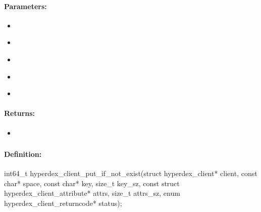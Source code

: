 \paragraph{Parameters:}
\begin{itemize}[noitemsep]
\item {}\\

\item {}\\

\item {}\\

\item {}\\

\item {}\\

\end{itemize}

\paragraph{Returns:}
\begin{itemize}[noitemsep]
\item {}\\

\end{itemize}

\pagebreak
\subsubsection{}
\label{api:c:put_if_not_exist}


\paragraph{Definition:}
\begin{ccode}
int64_t hyperdex_client_put_if_not_exist(struct hyperdex_client* client,
        const char* space,
        const char* key, size_t key_sz,
        const struct hyperdex_client_attribute* attrs, size_t attrs_sz,
        enum hyperdex_client_returncode* status);
\end{ccode}

